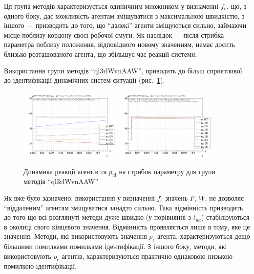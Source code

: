 \documentclass[a4paper,13pt]{atuaref}
\begin{document}
Ця група методів характеризується одиничним множником у визначенні $ f_e $, що,
з одного боку, дає можливість агентам зміщуватися з максимальною швидкістю, з
іншого --- призводить до того, що ``далекі'' агенти зміщуються сильно,
займаючи місце поблизу кордону своєї робочої смуги. Як наслідок --- після
стрибка параметра поблизу положення, відповідного новому значенням, немає
досить близько розташованого агента, що збільшує час реакції системи.


Використання  групи методів ``ql3rlWvnAAW'',
приводить до більш сприятливої до ідентифікації динамічних систем ситуації
(рис.~\ref{atu:f:ql3rlWvnAAW_sign}).

\begin{figure}[htb!]
  \centerline{
    \includegraphics[width=0.45\textwidth]{p3/p/sign/qls-p_t_pi_m_ql3rlWvnAAW_sign.png}
    \hfill
    \includegraphics[width=0.45\textwidth]{p3/p/sign/qls-p_t_p_m_ql3rlWvnAAW_sign.png}
  }
  \caption{Динамика реакції агентів та $p_\mathrm{id}$ на стрибок параметру для групи методів ``ql3rlWvnAAW''}
  \label{atu:f:ql3rlWvnAAW_sign}
\end{figure}

Як вже було зазначено, використання у визначенні $ f_e $ значень $F$, $W$,
не дозволяє ``віддаленим'' агентам зміщуватися занадто сильно. Така відмінність
призводить до того що всі розглянуті методи дуже швидко (у порівнянні з $ t_{ua} $)
стабілізуються в околиці свого кінцевого значення. Відмінність
проявляється лише в тому, яке це значення. Методи, які використовують значення
$ p_c $ агента, характеризуються дещо більшими помилками помилками
ідентифікації. З іншого боку, методи, які використовують $ p_e $ агентів,
характеризуються практично однаковою низькою помилкою ідентифікації.
\end{document}
